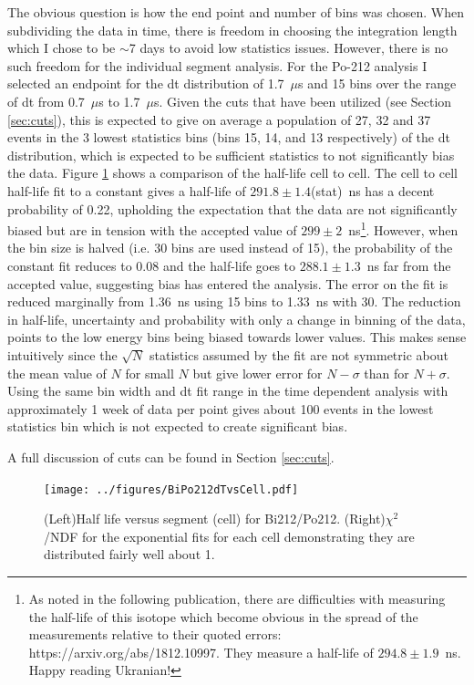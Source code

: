 The obvious question is how the end point and number of bins was chosen. When subdividing the data in time, there is freedom in choosing the integration length which I chose to be $\sim$7 days to avoid low statistics issues. However, there is no such freedom for the individual segment analysis. For the Po-212 analysis I selected an endpoint for the dt distribution of 1.7~$\mu$s and 15 bins over the range of dt from 0.7~$\mu$s to 1.7~$\mu$s. Given the cuts that have been utilized (see Section \ref{sec:cuts}), this is expected to give on average a population of 27, 32 and 37 events in the 3 lowest statistics bins (bins 15, 14, and 13 respectively) of the dt distribution, which is expected to be sufficient statistics to not significantly bias the data. Figure \ref{fig:Po212thalfvscell} shows a comparison of the half-life cell to cell. The cell to cell half-life fit to a constant gives a half-life of $291.8\pm1.4$(stat)~ns has a decent probability of 0.22, upholding the expectation that the data are not significantly biased but are in tension with the accepted value of $299\pm2$~ns\footnote{As noted in the following publication, there are difficulties with measuring the half-life of this isotope which become obvious in the spread of the measurements relative to their quoted errors: https://arxiv.org/abs/1812.10997. They measure a half-life of $294.8\pm1.9$~ns. Happy reading Ukranian!}. However, when the bin size is halved (i.e. 30 bins are used instead of 15), the probability of the constant fit reduces to 0.08 and the half-life goes to $288.1\pm1.3$~ns far from the accepted value, suggesting bias has entered the analysis. The error on the fit is reduced marginally from 1.36~ns using 15 bins to 1.33~ns with 30. The reduction in half-life, uncertainty and probability with only a change in binning of the data, points to the low energy bins being biased towards lower values. This makes sense intuitively since the $\sqrt{N}$ statistics assumed by the fit are not symmetric about the mean value of $N$ for small $N$ but give lower error for $N-\sigma$ than for $N+\sigma$. Using the same bin width and dt fit range in the time dependent analysis with approximately 1 week of data per point gives about 100 events in the lowest statistics bin which is not expected to create significant bias. 

A full discussion of cuts can be found in Section \ref{sec:cuts}.
\begin{figure}[!h]
	\centering
	\texttt{[image: ../figures/BiPo212dTvsCell.pdf]}
	\caption{\label{fig:Po212thalfvscell}(Left)Half life versus segment (cell) for Bi212/Po212. (Right)$\chi^2$/NDF for the exponential fits for each cell demonstrating they are distributed fairly well about 1.}
\end{figure}

